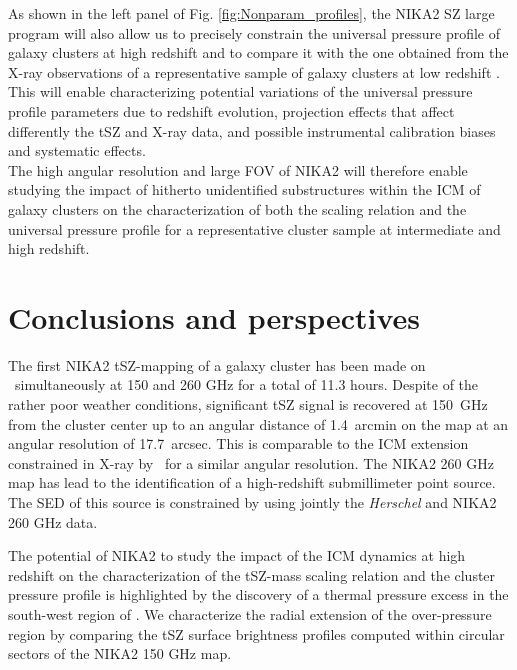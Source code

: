 \documentclass[traditabstract]{aa}
\begin{document}
\indent As shown in the left panel of Fig. \ref{fig:Nonparam_profiles}, the NIKA2 SZ large program will also allow us to precisely constrain the universal pressure profile of galaxy clusters at high redshift and to compare it with the one obtained from the X-ray observations of a representative sample of galaxy clusters at low redshift \citep[see \emph{e.g.} ][]{arn10}. This will enable characterizing potential variations of the universal pressure profile parameters due to redshift evolution, projection effects that affect differently the tSZ and X-ray data, and possible instrumental calibration biases and systematic effects.\\
\indent The high angular resolution and large FOV of NIKA2 will therefore enable studying the impact of hitherto unidentified substructures within the ICM of galaxy clusters on the characterization of both the scaling relation and the universal pressure profile for a representative cluster sample at intermediate and high redshift.

\section{Conclusions and perspectives}\label{sec:conclusions}
The first NIKA2 tSZ-mapping of a galaxy cluster has been made on \psz\ simultaneously at 150 and 260 GHz for a total of 11.3 hours. Despite of the rather poor weather conditions, significant tSZ signal is recovered at 150~GHz from the cluster center up to an angular distance of 1.4~arcmin on the map at an angular resolution of 17.7~arcsec. This is comparable to the ICM extension constrained in X-ray by \xmm\ for a similar angular resolution. The NIKA2 260 GHz map has lead to the identification of a high-redshift submillimeter point source. The SED of this source is constrained by using jointly the \emph{Herschel} and NIKA2 260 GHz data.

The potential of NIKA2 to study the impact of the ICM dynamics at high redshift on the characterization of the tSZ-mass scaling relation and the cluster pressure profile is highlighted by the discovery of a thermal pressure excess in the south-west region of \psz. We characterize the radial extension of the over-pressure region by comparing the tSZ surface brightness profiles computed within circular sectors of the NIKA2 150 GHz map.
\end{document}
